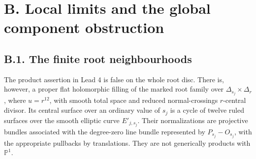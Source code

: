 



\section{B. Local limits and the global component obstruction}
\subsection{B.1. The finite root neighbourhoods}

\begin{proposition}\label{push:B11}
The product assertion in Lead 4 is false on the whole root
disc. There is, however, a proper flat holomorphic filling of
the marked root family over
$\Delta_{s_j}\times\Delta_r$, where $u=r^{12}$, with smooth
total space and reduced normal-crossings $r$-central divisor.
Its central surface over an ordinary value of $s_j$ is a cycle
of twelve ruled surfaces over the smooth elliptic curve
$E'_{j,s_j}$. Their normalizations are projective bundles
associated with the degree-zero line bundle represented by
$P_{s_j}-O_{s_j}$, with the appropriate pullbacks by translations.
They are not generically products with $\mathbb P^1$.
\end{proposition}
